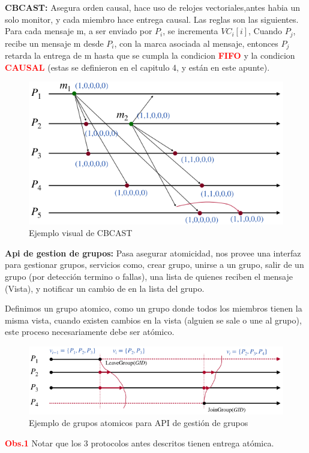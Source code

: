\textbf{CBCAST:} Asegura orden causal, hace uso de relojes vectoriales,antes habia un solo monitor, y cada miembro hace entrega causal. Las reglas son las siguientes. Para cada mensaje m, a ser enviado por $P_i$, se incrementa $VC_i[i]$, Cuando $P_j$,  recibe un mensaje m desde $P_i$, con la marca asociada al mensaje, entonces $P_j$ retarda la entrega de m hasta que se cumpla la condicion \textcolor{red}{\textbf{FIFO}} y la condicion \textcolor{red}{\textbf{CAUSAL}} (estas se definieron en el capitulo 4, y están en este apunte).

\begin{figure}[H]
    \centering
    \includegraphics[width=0.7\linewidth]{img/CBCAST.png}
    \caption{Ejemplo visual de CBCAST}\label{fig:1761675486364}
\end{figure}

\textbf{Api de gestion de grupos:} Pasa asegurar atomicidad, nos provee una interfaz para gestionar grupos, servicios como, crear grupo, unirse a un grupo, salir de un grupo (por detección termino o fallas), una lista de quienes reciben el mensaje (Vista), y notificar un cambio de en la lista del grupo.

Definimos un grupo atomico, como un grupo donde todos los miembros tienen la misma vista, cuando existen cambios en la vista (alguien se sale o une al grupo), este proceso necesariamente debe ser atómico.

\begin{figure}[H]
    \centering
    \includegraphics[width=0.5\linewidth]{img/Api_gestion.png}
    \caption{Ejemplo de grupos atomicos para API de gestión de grupos}\label{fig:1761676301300}
\end{figure}

\textcolor{red}{\textbf{Obs.1}} Notar que los 3 protocolos antes descritos tienen entrega atómica.


